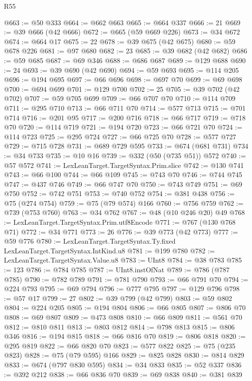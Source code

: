 \begin{lexlean}{R55}
\begin{coremodule}
@663 := @50 @333
@664 := @662 @663
@665 := @664 @337
@666 := 21
@669 := @39 @666 (@42 @666)
@672 := @665 (@59 @669 @226)
@673 := @34 @672
@674 := @664 @17
@675 := 22
@678 := @39 @675 (@42 @675)
@680 := @59 @678 @226
@681 := @97 @680
@682 := 23
@685 := @39 @682 (@42 @682)
@686 := @59 @685
@687 := @69 @346
@688 := @686 @687
@689 := @129 @688
@690 := 24
@693 := @39 @690 (@42 @690)
@694 := @59 @693
@695 := @114 @205
@696 := @194 @695
@697 := @66 @696
@698 := @697 @70
@699 := @69 @698
@700 := @694 @699
@701 := @129 @700
@702 := 25
@705 := @39 @702 (@42 @702)
@707 := @59 @705 @699
@709 := @66 @707 @70
@710 := @114 @709
@711 := @295 @710
@713 := @66 @711 @70
@714 := @577 @713
@715 := @701 @714
@716 := @201 @95
@717 := @200 @716
@718 := @66 @717
@719 := @718 @70
@720 := @114 @719
@721 := @194 @720
@723 := @66 @721 @70
@724 := @114 @723
@725 := @295 @724
@727 := @66 @725 @70
@728 := @577 @727
@729 := @715 @728
@731 := @689 @729 @595
@733 := @674 (@681 @731)
@734 := @34 @733
@735 := @10 @16
@739 := @332 (@50 (@735 @51)) @572
@740 := @57 @572
@741 := LexLeanTarget.TargetSyntax.Prim.slice
@742 := @130 @741
@743 := @66 @100
@744 := @66 @109
@745 := @743 @70
@746 := @744 @745
@747 := @437 @746
@749 := @66 @747 @70
@750 := @743 @749
@751 := @69 @750
@752 := @742 @751
@753 := @740 @752
@754 := @381 @438
@756 := @75 (@274 @754)
@759 := @75 (@79 @574) @166
@760 := @756 @759
@762 := @739 (@753 @760)
@763 := @34 @762
@767 := @48 (@10 @246 @20) @49
@768 := LexLeanTarget.TargetSyntax.Prim.utf8Encode
@771 := @767 (@130 @768 @71)
@772 := @34 @771
@773 := 26
@776 := @39 @773 (@42 @773)
@777 := @59 @776
@780 := LexLeanTarget.TargetSyntax.Ty.fixed LexLeanTarget.TargetSyntax.IntKind.u8
@781 := @199 @780
@782 := LexLeanTarget.TargetSyntax.Value.u8
@783 := UInt8
@784 := @38 @783
@785 := 123
@786 := @784 @785
@787 := UInt8.instOfNat
@789 := @786 (@787 @785)
@790 := @782 @789
@791 := @781 @790
@793 := @66 @791 @70
@794 := @224 @793
@795 := @69 @794
@796 := @777 @795
@797 := @129 @796
@798 := @57 @17
@799 := 27
@802 := @39 @799 (@42 @799)
@803 := @59 @802
@804 := @224 @205
@805 := @194 @804
@806 := @66 @805
@807 := @806 @70
@808 := @69 @807
@809 := @473 @808
@810 := @66 @809
@811 := @561 @70
@812 := @810 @811
@813 := @803 @812
@814 := @798 @813
@815 := @806 @346
@816 := @194 @815
@818 := @66 @816 @70
@819 := @806 @818
@820 := @295 @819
@822 := @66 @820 @70
@823 := @577 @822
@825 := @75 (@235 @823)
@828 := @75 (@79 @595) @166
@829 := @825 @828
@830 := @814 @829
@833 := @674 (@797 @830 @595)
@834 := @34 @833
@835 := @52 @337
@836 := @392 @212
@838 := @66 @836 @70
@839 := @69 @838
@840 := @381 @839

\end{coremodule}
\end{lexlean}
